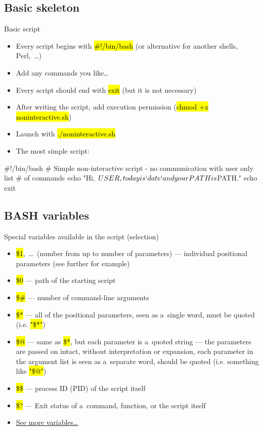 \documentclass[compress, ucs, xelatex, 11pt, xcolor=svgnames,
  hyperref={
    bookmarks=true,
    unicode=true,
    colorlinks=true,
    pdftitle={Linux, command line and MetaCentrum},
    plainpages=false,
    pdfauthor={Vojtech Zeisek},
    pdfsubject={Course about use of Linux command line, writing shell scripts and using MetaCentrum of CESNET},
    pdfcreator={XeLaTeX},
    pdfkeywords={Linux, GNU, BASH, shell, command line, MetaCentrum},
    linkcolor=DarkRed,
    anchorcolor=DarkBlue,
    citecolor=Indigo,
    filecolor=NavyBlue,
    menucolor=DarkMagenta,
    urlcolor=DarkBlue,
    pdftex},
  url={hyphens, lowtilde} %
  ]{beamer}
\renewcommand{\texttt}[1]{\hl{\ttfamily #1}}
\renewcommand{\alert}[1]{\textcolor{red}{#1}}
\begin{document}
\subsection{Basic skeleton}

\begin{frame}[fragile]{Basic script}
  \begin{itemize}
    \item Every script begins with \texttt{\#!/bin/bash} (or alternative for another shells, Perl,~\ldots)
    \item Add any commands you like\ldots
    \item Every script should end with \texttt{exit} (but it is not necessary)
    \item After writing the script, add execution permission (\texttt{chmod +x noninteractive.sh})
    \item Launch with \texttt{./noninteractive.sh}
    \item The most simple script:
  \end{itemize}
  \begin{bashcode}
    #!/bin/bash
    # Simple non-interactive script - no communication with user only list
    # of commands
    echo "Hi, $USER, today is `date` and your PATH is $PATH."
    echo
    exit
  \end{bashcode}
\end{frame}

\subsection{BASH variables}

\begin{frame}{Special variables available in the script (selection)}
  \begin{itemize}
    \item \alert{\texttt{\$1}},~\ldots~(number from \texttt{1} up to number of parameters) --- individual positional parameters (see further for example)
    \item \alert{\texttt{\$0}} --- path of the starting script
    \item \alert{\texttt{\$\#}} --- number of command-line arguments
    \item \alert{\texttt{\$*}} --- all of the positional parameters, seen as a~single word, must be quoted (i.e. \texttt{"\$*"})
    \item \alert{\texttt{\$@}} --- same as \texttt{\$*}, but each parameter is a~quoted string --- the parameters are passed on intact, without interpretation or expansion, each parameter in the argument list is seen as a~separate word, should be quoted (i.e. something like \texttt{"\$@"})
    \item \alert{\texttt{\$\$}} --- process ID (PID) of the script itself
    \item \alert{\texttt{\$?}} --- Exit status of a~command, function, or the script itself
    \item \href{https://www.tldp.org/LDP/abs/html/internalvariables.html}{See more variables\ldots}
  \end{itemize}
\end{frame}
\end{document}
